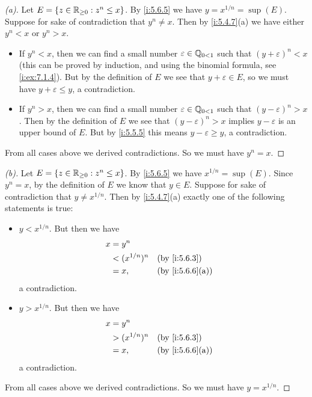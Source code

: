 \begin{proof}[(a)]
  Let \(E = \left\lbrace z \in \mathbb{R}_{\geq 0} : z^n \leq x\right\rbrace\).
  By \cref{i:5.6.5} we have \(y = x^{1 / n} = \sup(E)\).
  Suppose for sake of contradiction that \(y^n \neq x\).
  Then by \cref{i:5.4.7}(a) we have either \(y^n < x\) or \(y^n > x\).
  \begin{itemize}
    \item If \(y^n < x\), then we can find a small number \(\varepsilon \in \mathbb{Q}_{0 < 1}\) such that \((y + \varepsilon)^n < x\)
          (this can be proved by induction, and using the binomial formula, see \cref{i:ex:7.1.4}).
          But by the definition of \(E\) we see that \(y + \varepsilon \in E\), so we must have \(y + \varepsilon \leq y\), a contradiction.
    \item If \(y^n > x\), then we can find a small number \(\varepsilon \in \mathbb{Q}_{0 < 1}\) such that \((y - \varepsilon)^n > x\).
          Then by the definition of \(E\) we see that \((y - \varepsilon)^n > x\) implies \(y - \varepsilon\) is an upper bound of \(E\).
          But by \cref{i:5.5.5} this means \(y - \varepsilon \geq y\), a contradiction.
  \end{itemize}
  From all cases above we derived contradictions.
  So we must have \(y^n = x\).
\end{proof}

\begin{proof}[(b)]
  Let \(E = \left\lbrace z \in \mathbb{R}_{\geq 0} : z^n \leq x\right\rbrace\).
  By \cref{i:5.6.5} we have \(x^{1 / n} = \sup(E)\).
  Since \(y^n = x\), by the definition of \(E\) we know that \(y \in E\).
  Suppose for sake of contradiction that \(y \neq x^{1 / n}\).
  Then by \cref{i:5.4.7}(a) exactly one of the following statements is true:
  \begin{itemize}
    \item \(y < x^{1 / n}\).
          But then we have
          \begin{align*}
            x & = y^n                                \\
              & < (x^{1 / n})^n &  & \by{i:5.6.3}    \\
              & = x,            &  & \by{i:5.6.6}[a]
          \end{align*}
          a contradiction.
    \item \(y > x^{1 / n}\).
          But then we have
          \begin{align*}
            x & = y^n                                \\
              & > (x^{1 / n})^n &  & \by{i:5.6.3}    \\
              & = x,            &  & \by{i:5.6.6}[a]
          \end{align*}
          a contradiction.
  \end{itemize}
  From all cases above we derived contradictions.
  So we must have \(y = x^{1 / n}\).
\end{proof}

